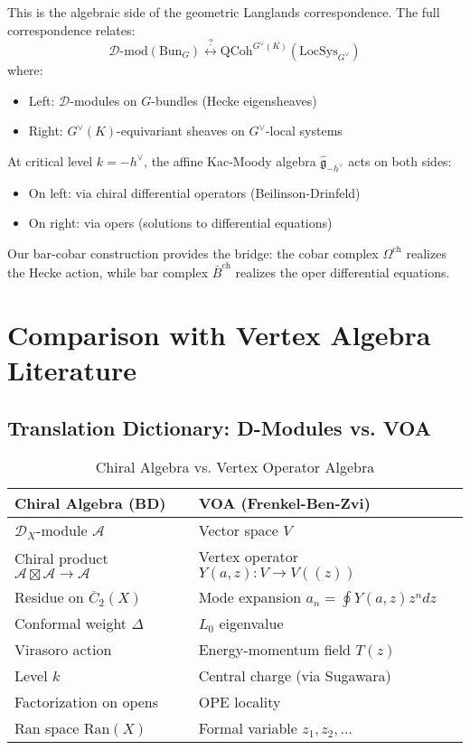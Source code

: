 \begin{remark}
This is the algebraic side of the geometric Langlands correspondence. The full correspondence relates:
$$\mathscr{D}\text{-mod}(\text{Bun}_G) \overset{?}{\longleftrightarrow} \text{QCoh}^{G^\vee(K)}(\text{LocSys}_{G^\vee})$$
where:
\begin{itemize}
\item Left: $\mathcal{D}$-modules on $G$-bundles (Hecke eigensheaves)
\item Right: $G^\vee(K)$-equivariant sheaves on $G^\vee$-local systems
\end{itemize}

At critical level $k = -h^\vee$, the affine Kac-Moody algebra $\widehat{\mathfrak{g}}_{-h^\vee}$ acts on both sides:
\begin{itemize}
\item On left: via chiral differential operators (Beilinson-Drinfeld)
\item On right: via opers (solutions to differential equations)
\end{itemize}

Our bar-cobar construction provides the bridge: the cobar complex $\Omega^{\text{ch}}$ realizes the Hecke action, while bar complex $\bar{B}^{\text{ch}}$ realizes the oper differential equations.
\end{remark}

\section{Comparison with Vertex Algebra Literature}

\subsection{Translation Dictionary: D-Modules vs. VOA}

\begin{table}[h]
\centering
\caption{Chiral Algebra vs. Vertex Operator Algebra}
\begin{tabular}{|p{5cm}|p{5cm}|}
\hline
\textbf{Chiral Algebra (BD)} & \textbf{VOA (Frenkel-Ben-Zvi)} \\
\hline
$\mathcal{D}_X$-module $\mathcal{A}$ & Vector space $V$ \\
\hline
Chiral product $\mathcal{A} \boxtimes \mathcal{A} \to \mathcal{A}$ & Vertex operator $Y(a,z): V \to V((z))$ \\
\hline
Residue on $\overline{C}_2(X)$ & Mode expansion $a_n = \oint Y(a,z)z^n dz$ \\
\hline
Conformal weight $\Delta$ & $L_0$ eigenvalue \\
\hline
Virasoro action & Energy-momentum field $T(z)$ \\
\hline
Level $k$ & Central charge (via Sugawara) \\
\hline
Factorization on opens & OPE locality \\
\hline
Ran space $\text{Ran}(X)$ & Formal variable $z_1, z_2, \ldots$ \\
\hline
\end{tabular}
\end{table}

